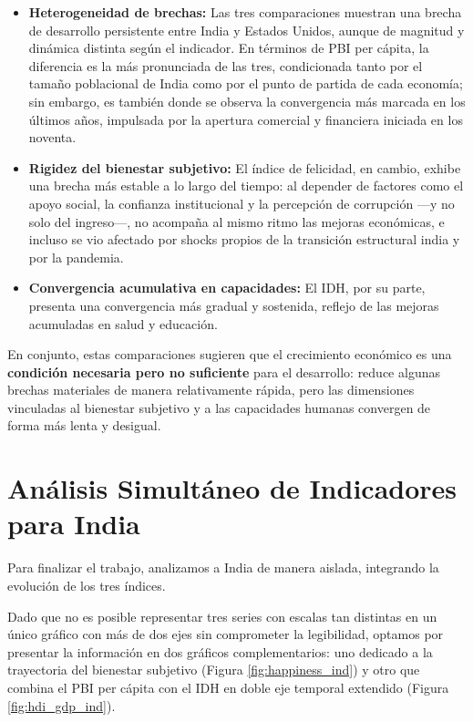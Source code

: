 \documentclass[11pt,a4paper]{article}
\begin{document}
\begin{itemize}[leftmargin=1.5em]
    \item \textbf{Heterogeneidad de brechas:} Las tres comparaciones muestran una brecha de desarrollo persistente entre India y Estados Unidos, aunque de magnitud y dinámica distinta según el indicador. En términos de PBI per cápita, la diferencia es la más pronunciada de las tres, condicionada tanto por el tamaño poblacional de India como por el punto de partida de cada economía; sin embargo, es también donde se observa la convergencia más marcada en los últimos años, impulsada por la apertura comercial y financiera iniciada en los noventa.
    \item \textbf{Rigidez del bienestar subjetivo:} El índice de felicidad, en cambio, exhibe una brecha más estable a lo largo del tiempo: al depender de factores como el apoyo social, la confianza institucional y la percepción de corrupción ---y no solo del ingreso---, no acompaña al mismo ritmo las mejoras económicas, e incluso se vio afectado por shocks propios de la transición estructural india y por la pandemia.
    \item \textbf{Convergencia acumulativa en capacidades:} El IDH, por su parte, presenta una convergencia más gradual y sostenida, reflejo de las mejoras acumuladas en salud y educación.
\end{itemize}

En conjunto, estas comparaciones sugieren que el crecimiento económico es una \textbf{condición necesaria pero no suficiente} para el desarrollo: reduce algunas brechas materiales de manera relativamente rápida, pero las dimensiones vinculadas al bienestar subjetivo y a las capacidades humanas convergen de forma más lenta y desigual.

\newpage

\section{Análisis Simultáneo de Indicadores para India}

Para finalizar el trabajo, analizamos a India de manera aislada, integrando la evolución de los tres índices. 

Dado que no es posible representar tres series con escalas tan distintas en un único gráfico con más de dos ejes sin comprometer la legibilidad, optamos por presentar la información en dos gráficos complementarios: uno dedicado a la trayectoria del bienestar subjetivo (Figura \ref{fig:happiness_ind}) y otro que combina el PBI per cápita con el IDH en doble eje temporal extendido (Figura \ref{fig:hdi_gdp_ind}).
\end{document}
